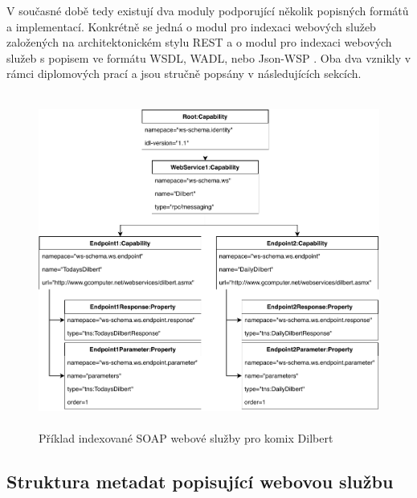 \documentclass[czech,DP]{thesiskiv}
\begin{document}
V současné době tedy existují dva moduly podporující několik popisných formátů a implementací. Konkrétně se jedná o modul pro indexaci webových služeb založených na architektonickém stylu REST\cite{hessova2015rest} a o modul pro indexaci webových služeb s popisem ve formátu WSDL, WADL, nebo Json-WSP \cite{pejrimovsky2015ws}. Oba dva vznikly v rámci diplomových prací a jsou stručně popsány v následujících sekcích.


\begin{figure}[h]
	\centering
	\includegraphics[height=11cm]{indexed-api-example}
	\caption{Příklad indexované SOAP webové služby pro komix Dilbert }
	\label{fig:indexed-api-example}
\end{figure}

\subsection{Struktura metadat popisující webovou službu}
\end{document}
